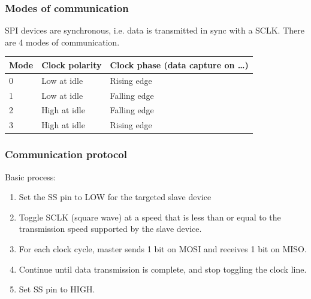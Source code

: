\documentclass[11pt]{article}
\begin{document}
\subsubsection{Modes of communication}
\label{sec:org301118d}
SPI devices are synchronous, i.e. data is transmitted in sync with a SCLK. There are 4 modes of communication.

\begin{center}
\begin{tabular}{m{2.5em}|m{10em}|m{15em}}
Mode & Clock polarity & Clock phase (data capture on \ldots{})\\
\hline
0 & Low at idle & Rising edge\\
1 & Low at idle & Falling edge\\
2 & High at idle & Falling edge\\
3 & High at idle & Rising edge\\
\end{tabular}
\end{center}

 \newpage
\subsubsection{Communication protocol}
\label{sec:org9c48144}
Basic process:
\begin{enumerate}
\item Set the SS pin to LOW for the targeted slave device
\item Toggle SCLK (square wave) at a speed that is less than or equal to the transmission speed supported by the slave device.
\item For each clock cycle, master sends 1 bit on MOSI and receives 1 bit on MISO.
\item Continue until data transmission is complete, and stop toggling the clock line.
\item Set SS pin to HIGH.
\end{enumerate}
\end{document}
